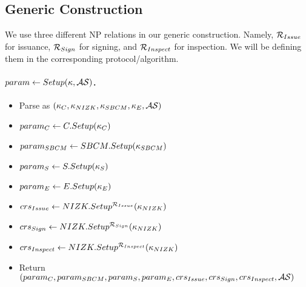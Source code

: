 


\subsection{Generic Construction \CUASGen}
\label{ssec:generic-construction-uas}

We use three different NP relations in our generic construction. Namely,
$\mathcal{R}_{Issue}$ for issuance, $\mathcal{R}_{Sign}$ for signing, and
$\mathcal{R}_{Inspect}$ for inspection. We will be defining them in the
corresponding protocol/algorithm.


\paragraph{$param \gets Setup(\kappa,\mathcal{AS})$.} %
\begin{itemize}
\item Parse \secpar as $(\kappa_{C},\kappa_{NIZK},\kappa_{SBCM},\kappa_{E},\mathcal{AS})$
\item $param_C \gets C.Setup(\kappa_{C})$
\item $param_{SBCM} \gets  SBCM.Setup(\kappa_{SBCM})$
\item $param_{S} \gets S.Setup(\kappa_{S})$  
\item $param_{E} \gets E.Setup(\kappa_{E})$
\item $crs_{Issue} \gets NIZK.Setup^{\mathcal{R}_{Issue}}(\kappa_{NIZK})$
\item $crs_{Sign} \gets NIZK.Setup^{\mathcal{R}_{Sign}}(\kappa_{NIZK})$
\item $crs_{Inspect} \gets NIZK.Setup^{\mathcal{R}_{Inspect}}(\kappa_{NIZK})$
\item Return $(param_C,param_{SBCM},param_{S},param_{E},crs_{Issue},
  crs_{Sign},crs_{Inspect},\mathcal{AS})$
\end{itemize}

